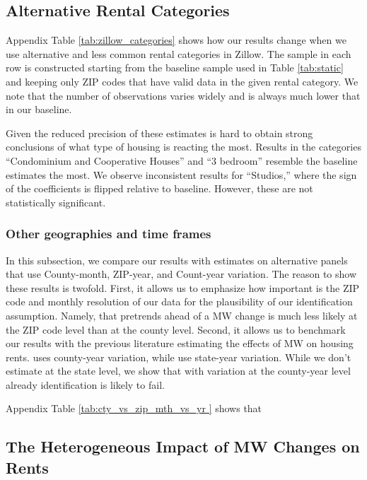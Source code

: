 \subsection{Alternative Rental Categories}

Appendix Table \ref{tab:zillow_categories} shows how our results change when we 
use alternative and less common rental categories in Zillow.
The sample in each row is constructed starting from the baseline sample used in 
Table \ref{tab:static} and keeping only ZIP codes that have valid data in the 
given rental category.
We note that the number of observations varies widely and is always much lower
that in our baseline.

Given the reduced precision of these estimates is hard to obtain strong conclusions 
of what type of housing is reacting the most.
Results in the categories ``Condominium and Cooperative Houses'' and ``3 bedroom''
resemble the baseline estimates the most.
We observe inconsistent results for ``Studios,'' where the sign of the coefficients
is flipped relative to baseline.
However, these are not statistically significant.

\subsubsection*{Other geographies and time frames}

In this subsection, we compare our results with estimates on alternative panels
that use County-month, ZIP-year, and Count-year variation. The reason to show 
these results is twofold. First, it allows us to emphasize how important 
is the ZIP code and monthly resolution of our data for the plausibility of our 
identification assumption. Namely, that pretrends ahead of a MW change is much 
less likely at the ZIP code level than at the county level. Second, it allows us 
to benchmark our results with the previous literature estimating
the effects of MW on housing rents. \textcite{Yamagishi2019} uses county-year variation,
while \textcite{Tidemann2018} use state-year variation. While we don't estimate at the
state level, we show that with variation at the county-year level already identification 
is likely to fail.

Appendix Table \ref{tab:cty_vs_zip_mth_vs_yr } shows that
 

\subsection{The Heterogeneous Impact of MW Changes on Rents}
\label{sec:heterogeneity_results}

